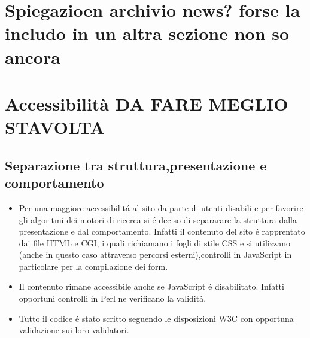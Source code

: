 \documentclass[12pt]{article}
\begin{document}
	\section{Spiegazioen archivio news? forse la includo in un altra sezione non so ancora}
			

\newpage

	\newpage
		\section{Accessibilit\`a DA FARE MEGLIO STAVOLTA}
		\subsection{Separazione tra struttura,presentazione e comportamento}
		\begin{itemize}
			\item Per una maggiore accessibilit\'a al sito da parte di utenti disabili e per favorire gli algoritmi dei motori di ricerca si \'e deciso di separarare la struttura dalla presentazione e dal comportamento.
			Infatti il contenuto del sito \'e rapprentato dai file HTML e CGI, i quali richiamano i fogli di stile CSS e si utilizzano (anche in questo caso attraverso percorsi esterni),controlli in JavaScript in particolare per la compilazione dei form. 

			\item Il contenuto rimane accessibile anche se JavaScript \'e disabilitato. Infatti opportuni controlli in Perl ne verificano la validit\`a.

			\item Tutto il codice \'e stato scritto seguendo le disposizioni W3C con opportuna validazione sui loro validatori.
		\end{itemize}
\end{document}
